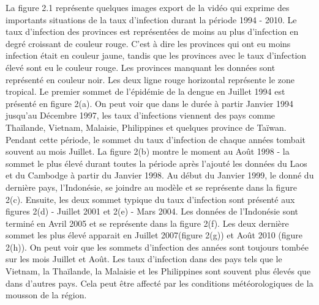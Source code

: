 La figure 2.1 représente quelques images export de la vidéo qui exprime des importants situations de la taux d'infection durant la période 1994 - 2010. Le taux d'infection des provinces est représentées de moins au plus d'infection en degré croissant de couleur rouge. C'est à dire les provinces qui ont eu moins infection était en couleur jaune, tandis que les provinces avec le taux d'infection élevé sont eu le couleur rouge. Les provinces manquant les données sont représenté en couleur noir. Les deux ligne rouge horizontal représente le zone tropical. Le premier sommet de l'épidémie de la dengue en Juillet 1994 est présenté en figure 2(a). On peut voir que dans le durée à partir Janvier 1994 jusqu'au Décembre 1997, les taux d'infections viennent des pays comme Thaïlande, Vietnam, Malaisie, Philippines et quelques province de Taïwan. Pendant cette période, le sommet du taux d'infection de chaque années tombait souvent au mois Juillet. La figure 2(b) montre le moment au Août 1998 - la sommet le plus élevé durant toutes la période après l'ajouté les données du Laos et du Cambodge à partir du Janvier 1998. Au début du Janvier 1999, le donné du dernière pays, l'Indonésie, se joindre au modèle et se représente dans la figure 2(c). Ensuite, les deux sommet typique du taux d'infection sont présenté aux figures 2(d) - Juillet 2001 et 2(e) - Mars 2004. Les données de l'Indonésie sont terminé en Avril 2005 et se représente dans la figure 2(f). Les deux dernière sommet les plus élevé apparait en Juillet 2007(figure 2(g)) et Août 2010 (figure 2(h)). On peut voir que les sommets d'infection des années sont toujours tombée sur les mois Juillet et Août.  Les taux d'infection dans des pays tels que le Vietnam, la Thaïlande, la Malaisie et les Philippines sont souvent plus élevés que dans d'autres pays. Cela peut être affecté par les conditions météorologiques de la mousson de la région. 
